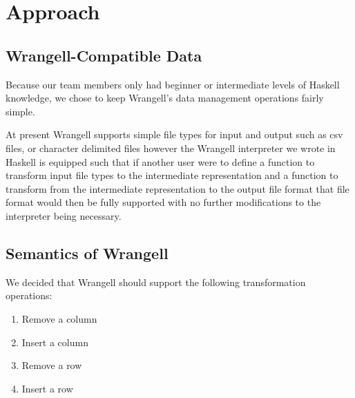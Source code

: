 \documentclass[preprint,nocopyrightspace]{sig-alternate}
\begin{document}
\section{Approach}

\subsection{Wrangell-Compatible Data}
Because our team members only had beginner or intermediate levels of Haskell knowledge, we chose to keep Wrangell's data management operations fairly simple. 

\begin{comment}
As a result, Wrangell's application subjects are limited to tables of data wherein columns are separated by either a comma or a user-specified delimiter. Furthermore, we allow the first row of data in a csv file to be a list of comma-separated labels, one for each column. We require that each column have a \emph{unique} label, to avoid ambiguity in potential future Wrangell features which may seek to identify columns per their labels. We decided to ultimately apply Wrangell to a variety of csv files. See Figure \ref{exampleTable} for an example of a Wrangell-compatible data table. 
\end{comment}
At present Wrangell supports simple file types for input and output such as csv files, or character delimited files however the Wrangell interpreter we wrote in Haskell is equipped such that if another user were to define a function to transform input file types to the intermediate representation and a function to transform from the intermediate representation to the output file format that file format would then be fully supported with no further modifications to the interpreter being necessary.


\subsection{Semantics of Wrangell}
We decided that Wrangell should support the following transformation operations:
\begin{enumerate}
\item Remove a column
\item Insert a column
\item Remove a row
\item Insert a row
\end{enumerate}

\begin{comment}
TODO: add stuff about doing transformations on data
\end{comment}
\end{document}
